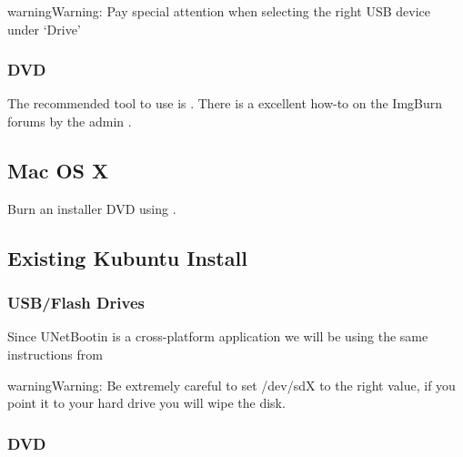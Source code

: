 \documentclass[letterpaper,10pt,english]{sphinxmanual}
\begin{document}
\begin{sphinxadmonition}{warning}{Warning:}
Pay special attention when selecting the right USB device under `Drive'
\end{sphinxadmonition}


\subsubsection{DVD}
\label{\detokenize{docs/installation:dvd}}
The recommended tool to use is . There is a excellent how-to on the ImgBurn forums by the admin .


\subsection{Mac OS X}
\label{\detokenize{docs/installation:kubuntu-install-link}}\label{\detokenize{docs/installation:mac-os-x}}
Burn an installer DVD using .


\subsection{Existing Kubuntu Install}
\label{\detokenize{docs/installation:existing-kubuntu-install}}

\subsubsection{USB/Flash Drives}
\label{\detokenize{docs/installation:id1}}
Since UNetBootin is a cross-platform application we will be using the same instructions from {\hyperref[\detokenize{docs/installation:usb-drives-link}]{}}

\begin{sphinxadmonition}{warning}{Warning:}
Be extremely careful to set /dev/sdX to the right value, if you point it to your hard drive you will wipe the disk.
\end{sphinxadmonition}


\subsubsection{DVD}
\label{\detokenize{docs/installation:id2}}
\end{document}
